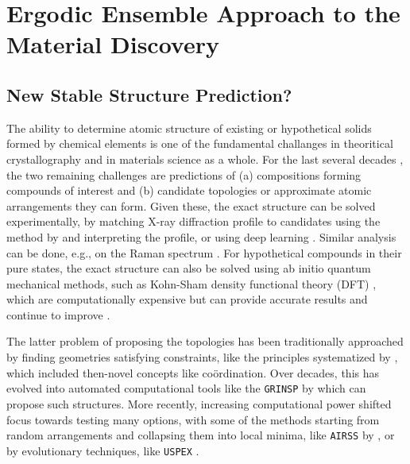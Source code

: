 \chapter{Ergodic Ensemble Approach to the Material Discovery} \label{chap:crystall}


\section{New Stable Structure Prediction?} \label{crystall:sec:newstable}

The ability to determine atomic structure of existing or hypothetical solids formed by chemical elements is one of the fundamental challanges in theoritical crystallography and in materials science as a whole. For the last several decades \cite{Hawthorne1994}, the two remaining challenges are predictions of (a) compositions forming compounds of interest and (b) candidate topologies or approximate atomic arrangements they can form. Given these, the exact structure can be solved experimentally, by matching X-ray diffraction profile to candidates using the method by \citet{LeBail1988} and interpreting the profile, or using deep learning \cite{Yue2024}. Similar analysis can be done, e.g., on the Raman spectrum \cite{Ferrari2013}. For hypothetical compounds in their pure states, the exact structure can also be solved using ab initio quantum mechanical methods, such as Kohn-Sham density functional theory (DFT) \cite{Kohn1965}, which are computationally expensive but can provide accurate results and continue to improve \cite{Kothakonda2023}.

The latter problem of proposing the topologies has been traditionally approached by finding geometries satisfying constraints, like the principles systematized by \citet{Pauling1929TheCrystals}, which included then-novel concepts like coördination. Over decades, this has evolved into automated computational tools like the \texttt{GRINSP} by \citet{LeBail2005} which can propose such structures. More recently, increasing computational power shifted focus towards testing many options, with some of the methods starting from random arrangements and collapsing them into local minima, like \texttt{AIRSS} by \citet{Pickard2011}, or by evolutionary techniques, like \texttt{USPEX} \cite{Glass2006}. 

